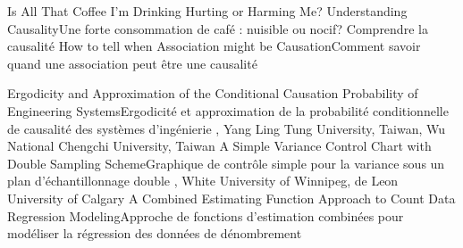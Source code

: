 
{
}
{Is All That Coffee I’m Drinking Hurting or Harming Me? Understanding Causality}{Une forte consommation de café : nuisible ou nocif? Comprendre la causalité }
{\bubbleE \enspace \screenE}
{
}
{How to tell when Association might be Causation}{Comment savoir quand une association peut être une causalité }
{\bubbleE \enspace \screenE}


{
}
{Ergodicity and Approximation of the Conditional Causation Probability of Engineering Systems}{Ergodicité et approximation de la probabilité conditionnelle de causalité des systèmes d’ingénierie }
{\bubbleE \enspace \screenE}
{
,  {Yang}
{Ling Tung University, Taiwan},  {Wu}
{National Chengchi University, Taiwan}
}
{A Simple Variance Control Chart with Double Sampling Scheme}{Graphique de contrôle simple pour la variance sous un plan d’échantillonnage double}
{\bubbleE \enspace \screenE}
{
,  {White}
{University of Winnipeg},  {de Leon}
{University of Calgary}
}
{A Combined Estimating Function Approach to Count Data Regression Modeling}{Approche de fonctions d’estimation combinées pour modéliser la régression des données de dénombrement}
{\bubbleE \enspace \screenE}


